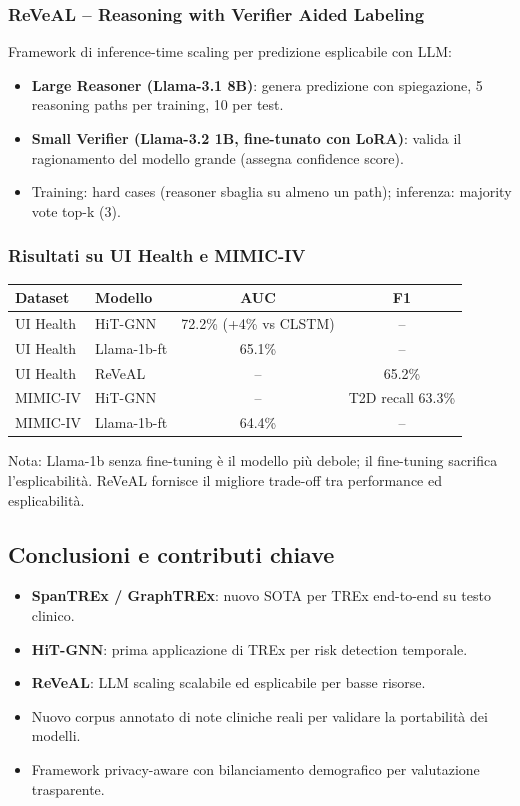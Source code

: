 \documentclass[a4paper,12pt]{article}
\begin{document}
\subsubsection{ReVeAL -- Reasoning with Verifier Aided Labeling}
Framework di inference-time scaling per predizione esplicabile con LLM:
\begin{itemize}
    \item \textbf{Large Reasoner (Llama-3.1 8B)}: genera predizione con spiegazione, 5 reasoning paths per training, 10 per test.
    \item \textbf{Small Verifier (Llama-3.2 1B, fine-tunato con LoRA)}: valida il ragionamento del modello grande (assegna confidence score).
    \item Training: hard cases (reasoner sbaglia su almeno un path); inferenza: majority vote top-k (3).
\end{itemize}

\subsubsection{Risultati su UI Health e MIMIC-IV}
\begin{center}
\begin{tabular}{llcc}
\toprule
\textbf{Dataset} & \textbf{Modello} & \textbf{AUC} & \textbf{F1} \\
\midrule
UI Health & HiT-GNN & 72.2\% (+4\% vs CLSTM) & -- \\
UI Health & Llama-1b-ft & 65.1\% & -- \\
UI Health & ReVeAL & -- & 65.2\% \\
MIMIC-IV & HiT-GNN & -- & T2D recall 63.3\% \\
MIMIC-IV & Llama-1b-ft & 64.4\% & -- \\
\bottomrule
\end{tabular}
\end{center}
Nota: Llama-1b senza fine-tuning \`e il modello pi\`u debole; il fine-tuning sacrifica l'esplicabilit\`a. ReVeAL fornisce il migliore trade-off tra performance ed esplicabilit\`a.

\subsection{Conclusioni e contributi chiave}
\begin{itemize}
    \item \textbf{SpanTREx / GraphTREx}: nuovo SOTA per TREx end-to-end su testo clinico.
    \item \textbf{HiT-GNN}: prima applicazione di TREx per risk detection temporale.
    \item \textbf{ReVeAL}: LLM scaling scalabile ed esplicabile per basse risorse.
    \item Nuovo corpus annotato di note cliniche reali per validare la portabilit\`a dei modelli.
    \item Framework privacy-aware con bilanciamento demografico per valutazione trasparente.
\end{itemize}
\end{document}

